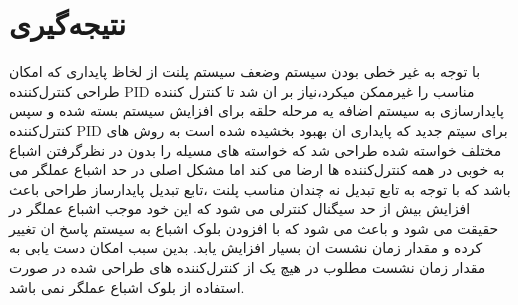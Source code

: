 \chapter{نتیجه‌گیری} 
با توجه به غیر خطی بودن سیستم وضعف سیستم پلنت از لخاظ پایداری که امکان طراحی کنترل‌کننده PID مناسب را غیرممکن میکرد،نیاز بر ان شد تا کنترل کننده پایدارسازی به سیستم اضافه یه مرحله حلقه برای افزایش سیستم بسته شده و سپس کنترل‌کننده PID برای سیتم جدید که پایداری ان بهبود بخشیده شده است به روش های مختلف خواسته شده طراحی شد که خواسته های مسیله را بدون در نظرگرفتن اشباع به خوبی در همه کنترل‌کننده ها ارضا می کند اما مشکل اصلی در حد اشباع عملگر می باشد که با توجه به تابع تبدیل نه چندان مناسب پلنت ،تابع تبدیل پایدارساز طراحی باعث افزایش بیش از حد سیگنال کنترلی می شود که این خود موجب اشباع عملگر در حقیقت می شود و باعث می شود که با افزودن بلوک اشباع به سیستم پاسخ ان تغییر کرده و مقدار زمان نشست ان بسیار افزایش یابد. بدین سبب امکان دست یابی به مقدار زمان نشست مطلوب در هیچ یک از کنترل‌کننده های طراحی شده در صورت استفاده از بلوک اشباع عملگر نمی باشد.